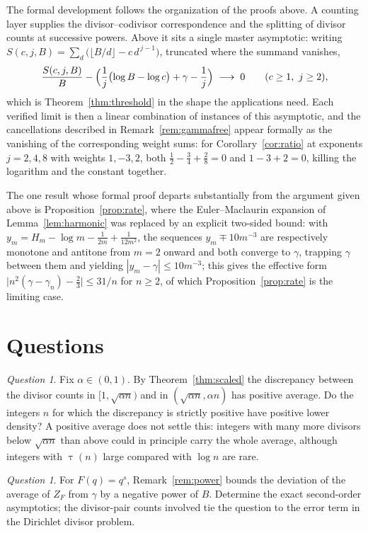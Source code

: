 \documentclass[11pt]{amsart}
\theoremstyle{remark}
\newtheorem{question}[theorem]{Question}
\newcommand{\eul}{\gamma}
\DeclareMathOperator{\divc}{\tau}
\begin{document}
The formal development follows the organization of the proofs above.
A counting layer supplies the divisor--codivisor correspondence and the
splitting of divisor counts at successive powers.  Above it sits a
single master asymptotic: writing
$S(c,j,B)=\sum_{d}\bigl(\lfloor B/d\rfloor-c\,d^{\,j-1}\bigr)$,
truncated where the summand vanishes,
\[
\frac{S(c,j,B)}{B}
-\Bigl(\frac{1}{j}\bigl(\log B-\log c\bigr)+\eul-\frac1j\Bigr)
\;\longrightarrow\;0
\qquad (c\ge1,\ j\ge2),
\]
which is Theorem~\ref{thm:threshold} in the shape the applications
need.  Each verified limit is then a linear combination of instances of
this asymptotic, and the cancellations described in
Remark~\ref{rem:gammafree} appear formally as the vanishing of the
corresponding weight sums: for Corollary~\ref{cor:ratio} at exponents
$j=2,4,8$ with weights $1,-3,2$, both
$\tfrac12-\tfrac34+\tfrac28=0$ and $1-3+2=0$, killing the logarithm and
the constant together.

The one result whose formal proof departs substantially from the
argument given above is Proposition~\ref{prop:rate}, where the
Euler--Maclaurin expansion of Lemma~\ref{lem:harmonic} was replaced by
an explicit two-sided bound: with
$y_{m}=H_{m}-\log m-\frac1{2m}+\frac1{12m^{2}}$, the sequences
$y_{m}\mp10m^{-3}$ are respectively monotone and antitone from $m=2$
onward and both converge to $\eul$, trapping $\eul$ between them and
yielding $|y_{m}-\eul|\le10m^{-3}$; this gives the effective form
$\bigl|n^{2}(\eul-\eul_{n})-\tfrac23\bigr|\le31/n$ for $n\ge2$, of which
Proposition~\ref{prop:rate} is the limiting case.

\section{Questions}\label{sec:questions}

\begin{question}\label{q:density}
Fix $\alpha\in(0,1)$.  By Theorem~\ref{thm:scaled} the discrepancy
between the divisor counts in $[1,\sqrt{\alpha n})$ and in
$(\sqrt{\alpha n},\alpha n)$ has positive average.  Do the integers $n$
for which the discrepancy is strictly positive have positive lower
density?  A positive average does not settle this: integers with
many more divisors below $\sqrt{\alpha n}$ than above could in
principle carry the whole average, although integers with
$\divc(n)$ large compared with $\log n$ are rare.
\end{question}

\begin{question}\label{q:secondorder}
For $F(q)=q^{s}$, Remark~\ref{rem:power} bounds the deviation of the
average of $Z_{F}$ from $\eul$ by a negative power of $B$.  Determine
the exact second-order asymptotics; the divisor-pair counts involved
tie the question to the error term in the Dirichlet divisor problem.
\end{question}
\end{document}
